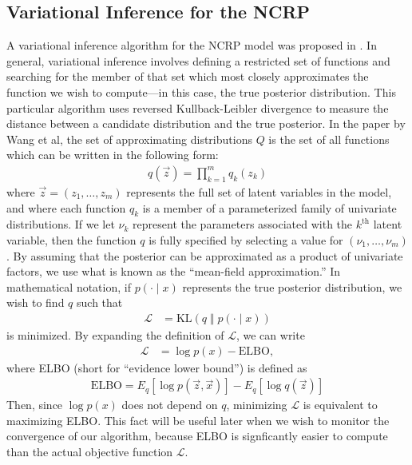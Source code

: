 \documentclass{article}
\newcommand{\nth}{^{\text{th}}}
\begin{document}

\subsection{Variational Inference for the NCRP}

A variational inference algorithm for the NCRP model was proposed in \cite{wang2009vi_ncrp}.
In general, variational inference involves defining a restricted set of functions and searching for the member of that set which most closely approximates the function we wish to compute---in this case, the true posterior distribution.
This particular algorithm uses reversed Kullback-Leibler divergence to measure the distance between a candidate distribution and the true posterior.
In the paper by Wang et al, the set of approximating distributions $Q$ is the set of all functions which can be written in the following form:
\begin{align}
q(\vec z) = \prod_{k=1}^m q_k(z_k)
\end{align}
where $\vec z = (z_1, \ldots, z_m)$ represents the full set of latent variables in the model, and where each function $q_k$ is a member of a parameterized family of univariate distributions.
If we let $\nu_k$ represent the parameters associated with the $k\nth$ latent variable, then the function $q$ is fully specified by selecting a value for $(\nu_1, \ldots, \nu_m)$.
By assuming that the posterior can be approximated as a product of univariate factors, we use what is known as the ``mean-field approximation.''
In mathematical notation, if $p(\cdot \mid x)$ represents the true posterior distribution, we wish to find $q$ such that
\begin{align}
\mathcal L &= \text{KL}( q \;\Vert\; p(\cdot \mid x) )
\end{align}
is minimized.
By expanding the definition of $\mathcal L$, we can write
\begin{align}
\mathcal L &= \log p(x) - \text{ELBO},
\end{align}
where ELBO (short for ``evidence lower bound'') is defined as
\begin{align}
\text{ELBO} = E_q[\log p(\vec z, \vec x)] - E_q[\log q(\vec z)]
\end{align}
Then, since $\log p(x)$ does not depend on $q$, minimizing $\mathcal L$ is equivalent to maximizing ELBO.
This fact will be useful later when we wish to monitor the convergence of our algorithm, because ELBO is signficantly easier to compute than the actual objective function $\mathcal L$.
\end{document}
